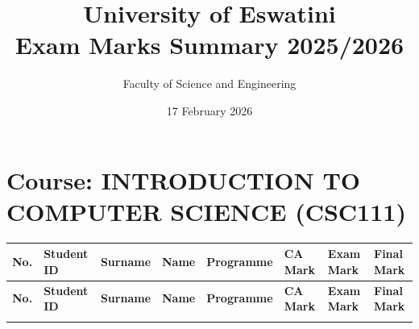\documentclass[12pt]{article}
\title{University of Eswatini \\ Exam Marks Summary 2025/2026}
\author{Faculty of Science and Engineering}
\date{17 February 2026}
\begin{document}
\maketitle

\section*{Course: INTRODUCTION TO COMPUTER SCIENCE (CSC111)}

\begin{longtable}{@{}llllllll@{}}
\toprule
\textbf{No.} & \textbf{Student ID} & \textbf{Surname} & \textbf{Name} & \textbf{Programme} & \textbf{CA Mark} & \textbf{Exam Mark} & \textbf{Final Mark} \\
\midrule
\endfirsthead

\toprule
\textbf{No.} & \textbf{Student ID} & \textbf{Surname} & \textbf{Name} & \textbf{Programme} & \textbf{CA Mark} & \textbf{Exam Mark} & \textbf{Final Mark} \\
\midrule
\endhead

\bottomrule
\endfoot


\end{longtable}
\end{document}
